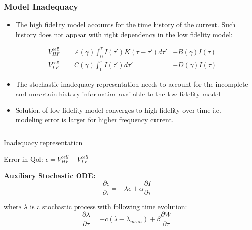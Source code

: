 \documentclass[8pt]{beamer}
\begin{document}
\begin{frame}
\frametitle{Model Inadequacy}
\vfill

\vspace{0.1in}
\begin{itemize}
\item The high fidelity model accounts for the time history of the current. Such history does not appear with right dependency in the low fidelity model: 
%
\begin{small}
\begin{eqnarray*}
V^{cell}_{HF} =& A(\gamma)\int_0^{\tau} I(\tau') K(\tau-\tau') d\tau' &+ B(\gamma) I(\tau)\\
V^{cell}_{LF} =& C(\gamma)\int_0^{\tau} I(\tau') d\tau' &+ D(\gamma) I(\tau)
\end{eqnarray*}
\end{small}
\item The stochastic inadequacy representation needs to account for the incomplete and uncertain history information available to the low-fidelity model.
\item Solution of low fidelity model converges to high fidelity over time i.e. modeling error is larger for higher frequency current. 
\end{itemize}

\vspace{0.in}
\begin{columns}
\begin{column}{.44\textwidth}
\vspace{-0.05in}
\begin{alertblock}{Inadequacy representation}

\begin{center}
Error in QoI: \quad
$\epsilon = V^{cell}_{HF} - V^{cell}_{LF}$
\end{center}
\vspace{-0.05in}
\textbf{Auxiliary Stochastic ODE:}
\begin{equation*}
\frac{\partial\epsilon}{\partial\tau} = -\lambda\epsilon + \alpha \frac{\partial I}{\partial\tau}
\end{equation*}

where $\lambda$ is a stochastic process with following time evolution:
\begin{equation*}
\frac{\partial\lambda}{\partial\tau} = -c(\lambda - \lambda_{mean}) + \beta \frac{\partial W}{\partial\tau}
\end{equation*}


\end{alertblock}
\end{column}
\end{columns}
\end{frame}
\end{document}
